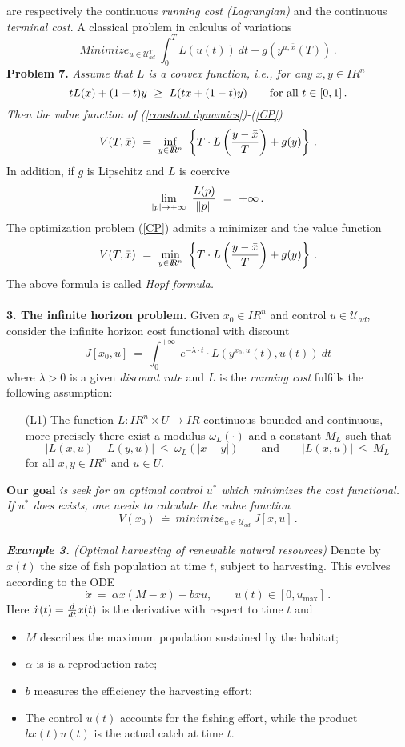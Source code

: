 \documentclass[letterpaper,12pt]{article}
\numberwithin{equation}{section}
\newcommand{\R}{\mathbb{R}}
\def\forall{\hbox{for all}~}
\def\R{I\!\!R}
\def\bel{\begin{equation}\label}
\def\eeq{\end{equation}}
\begin{document}
are respectively the continuous \textit{running cost (Lagrangian)} and the continuous \textit{terminal cost}. A classical problem in calculus of variations
\bel{CP}
Minimize_{u\in\mathcal{U}^{T}_{ad}}~\int_{0}^{T}L(u(t))~dt+g(y^{u,\bar{x}}(T))\,.
\eeq
{\bf Problem 7.} {\it Assume that $L$ is a convex function, i.e., for any $x,y\in\R^n$
\[
tL(x)+(1-t)y~\geq~L(tx+(1-t)y)\qquad\forall t\in [0,1]\,.
\]
Then the value function of (\ref{constant dynamics})-(\ref{CP})
\[
V(T,\bar{x})~=~\inf_{y\in\R^n}~\left\{T\cdot L\left({y-\bar{x}\over T}\right)+g(y)\right\}\,.
\]
}
In addition, if $g$ is Lipschitz and  $L$ is coercive
\[
\lim_{|p|\to +\infty}~{L(p)\over \|p\|}~=~+\infty\,.
\]
The optimization problem (\ref{CP}) admits a minimizer and the value function 
\[
V(T,\bar{x})~=~\min_{y\in\R^n}~\left\{T\cdot L\left({y-\bar{x}\over T}\right)+g(y)\right\}\,.
\]
The above formula is called {\it Hopf formula.}
\quad\\
\quad\\
{\bf 3. The infinite horizon problem.} Given $x_0\in\R^n$ and control $u\in\mathcal{U}_{ad}$, consider the infinite horizon cost functional with discount 
\bel{INF-H}
J[x_0,u]~=~\int_{0}^{+\infty}~e^{-\lambda\cdot t}\cdot L(y^{x_0,u}(t),u(t))~dt
\eeq
where $\lambda>0$ is a given {\it discount rate} and $L$ is the {\it running cost} fulfills the following assumption:
\begin{itemize}
\item [(L1)] The function $L:\R^n\times U\to \R$ continuous bounded and continuous, more precisely there exist a modulus $\omega_{L}(\cdot)$ and a constant $M_{L}$ such that 
\[
|L(x,u)-L(y,u)|~\leq~\omega_{L}(|x-y|)\qquad\mathrm{and}\qquad |L(x,u)|~\leq~M_{L}
\]
for all $x,y\in\R^n$ and $u\in U$.
\end{itemize}
{\bf Our goal} {\it is seek for an optimal control $u^*$ which minimizes the cost functional. If $u^*$ does exists, one needs to calculate the value function
\[
V(x_0)~\doteq~minimize_{u\in \mathcal{U}_{ad}}~J[x,u]\,.
\]
\quad\\
{\bf Example 3.}  (Optimal harvesting of renewable natural resources)} Denote by $x(t)$ the size of fish population at time $t$, subject to harvesting. This evolves
according to the ODE
\[
\dot{x}~=~\alpha x(M-x)-bxu,\qquad u(t)\in [0,u_{\max}]\,.
\]
Here $\dot{x}(t)={d\over dt}x(t)$ is the derivative with respect to time $t$ and 
\begin{itemize}
\item $M$ describes the maximum population sustained by the habitat;
\item $\alpha$ is is a reproduction rate;
\item $b$ measures the efficiency the harvesting effort;
\item The control $u(t)$ accounts for the fishing effort, while the product $bx(t)u(t)$ is the actual catch at time $t$. 
\end{itemize}
\end{document}
